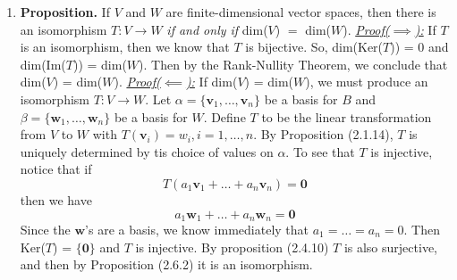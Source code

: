 \documentclass[oneside, 12pt]{book}
\newcommand{\settag}[1]{\renewcommand{\theenumi}{#1}}
\newcommand{\tbf}[1]{\textbf{#1}}
\newcommand{\tit}[1]{\textit{#1}}
\newcommand{\proofforward}{\tit{\underline{Proof($\implies$):}}}
\newcommand{\proofback}{\tit{\underline{Proof($\impliedby$):}}}
\newcommand{\trans}[3]{$#1:#2\rightarrow{}#3$}
\newcommand{\para}[1]{\item \tbf{#1}}
\newcommand{\vv}{\mathbf{v}}
\newcommand{\vw}{\mathbf{w}}
\newcommand{\vzero}{\mathbf{0}}
\begin{document}
\begin{enumerate}
    \settag{2.6.7}
    \para{Proposition.} If $V$ and $W$ are finite-dimensional vector spaces, then there is an isomorphism \trans{T}{V}{W} \tit{if and only if} dim($V$) $=$ dim($W$). \newline
    \proofforward \newline
    If $T$ is an isomorphism, then we know that $T$ is bijective. So,
    dim(Ker($T$)) = 0 and dim(Im($T$)) = dim($W$). Then by the Rank-Nullity Theorem, we conclude that dim($V$) = dim($W$).\newline
    \proofback \newline
    If dim($V$) = dim($W$), we must produce an isomorphism \trans{T}{V}{W}. Let $\alpha = \{\vv_1, \ldots, \vv_n\}$ be a basis for $B$ and $\beta = \{\vw_1,\ldots,\vw_n\}$ be a basis for $W$. Define $T$ to be the linear transformation from $V$ to $W$ with $T(\vv_i) = w_i, i = 1,\ldots,n$. By Proposition (2.1.14), $T$ is uniquely determined by tis choice of values on $\alpha$. To see that $T$ is injective, notice that if
    \begin{equation*}
        T(a_1\vv_1 + \ldots + a_n\vv_n) = \vzero
    \end{equation*}
    then we have
    \begin{equation*}
        a_1\vw_1 + \ldots + a_n\vw_n = \vzero
    \end{equation*}
    Since the $\vw$'s are a basis, we know immediately that $a_1 = \ldots = a_n = 0$. Then Ker($T$) = $\{\vzero\}$ and $T$ is injective. By proposition (2.4.10) $T$ is also surjective, and then by Proposition (2.6.2) it is an isomorphism.
    

\end{enumerate}
\end{document}
